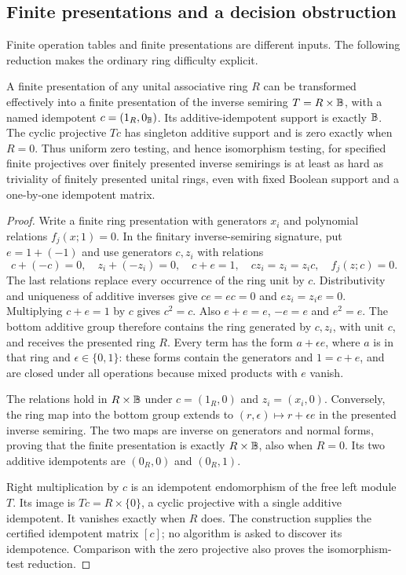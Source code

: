 \subsection{Finite presentations and a decision obstruction}
Finite operation tables and finite presentations are different inputs.
The following reduction makes the ordinary ring difficulty explicit.
\begin{proposition}\label{prop:projective-decision-reduction}
A finite presentation of any unital associative ring $R$ can be
transformed effectively into a finite presentation of the inverse
semiring $T=R\times\mathbb B$, with a named idempotent $c=(1_R,0_\mathbb B)$.
Its additive-idempotent support is exactly $\mathbb B$. The cyclic projective
$Tc$ has singleton additive support and is zero exactly when $R=0$.
Thus uniform zero testing, and hence isomorphism testing, for specified
finite projectives over finitely presented inverse semirings is at
least as hard as triviality of finitely presented unital rings, even
with fixed Boolean support and a one-by-one idempotent matrix.
\end{proposition}
\begin{proof}
Write a finite ring presentation with generators $x_i$ and polynomial
relations $f_j(x;1)=0$. In the finitary inverse-semiring signature,
put $e=1+(-1)$ and use generators $c,z_i$ with relations
\[
 c+(-c)=0,\quad z_i+(-z_i)=0,\quad c+e=1,
 \quad cz_i=z_i=z_ic,\quad f_j(z;c)=0.
\]
The last relations replace every occurrence of the ring unit by $c$.
Distributivity and uniqueness of additive inverses give
$ce=ec=0$ and $ez_i=z_ie=0$. Multiplying $c+e=1$ by $c$ gives
$c^2=c$. Also $e+e=e$, $-e=e$ and $e^2=e$.
The bottom additive group therefore contains the ring generated by
$c,z_i$, with unit $c$, and receives the presented ring $R$.
Every term has the form $a+\epsilon e$, where $a$ is in that ring
and $\epsilon\in\{0,1\}$: these forms contain the generators and
$1=c+e$, and are closed under all operations because mixed products
with $e$ vanish.

The relations hold in $R\times\mathbb B$ under
$c=(1_R,0)$ and $z_i=(x_i,0)$. Conversely, the ring map into the
bottom group extends to
$(r,\epsilon)\mapsto r+\epsilon e$ in the presented inverse semiring.
The two maps are inverse on generators and normal forms, proving
that the finite presentation is exactly $R\times\mathbb B$, also when
$R=0$. Its two additive idempotents are $(0_R,0)$ and $(0_R,1)$.

Right multiplication by $c$ is an idempotent endomorphism of the
free left module $T$. Its image is $Tc=R\times\{0\}$, a cyclic
projective with a single additive idempotent. It vanishes exactly
when $R$ does. The construction supplies the certified idempotent
matrix $[c]$; no algorithm is asked to discover its idempotence.
Comparison with the zero projective also proves the isomorphism-test
reduction.
\end{proof}

